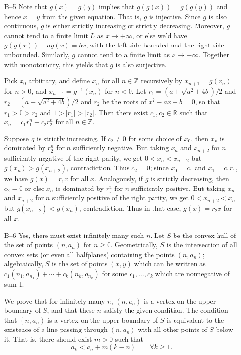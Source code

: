 \documentclass[amssymb,twocolumn,pra,10pt,aps]{revtex4-1}
\newcommand{\RR}{\mathbb{R}}
\newcommand{\ZZ}{\mathbb{Z}}
\begin{document}
\begin{itemize}
\item[B--5]
Note that $g(x) = g(y)$ implies that $g(g(x)) = g(g(y))$ and hence
$x = y$ from the given equation. That is, $g$ is injective. Since $g$
is also continuous, $g$ is either strictly increasing or strictly
decreasing. Moreover, $g$ cannot tend to a finite limit $L$ as $x \to
+\infty$, or else we'd have $g(g(x)) - ag(x) = bx$, with the left side
bounded and the right side unbounded. Similarly, $g$ cannot tend to
a finite limit as $x \to -\infty$. Together with monotonicity, this
yields that $g$ is also surjective.

Pick $x_0$ arbitrary, and define $x_n$ for all $n \in \ZZ$ recursively
by $x_{n+1} = g(x_n)$ for $n > 0$, and $x_{n-1} = g^{-1}(x_n)$ for $n<0$.
Let $r_1 = (a + \sqrt{a^2+4b})/2$ and $r_2 = (a - \sqrt{a^2+4b})/2$ and
$r_2$ be the roots of $x^2 - ax-b = 0$, so that $r_1 > 0 >
r_2$ and $1 > |r_1| > |r_2|$. Then there exist $c_1, c_2 \in \RR$ such that
$x_n = c_1 r_1^n + c_2 r_2^n$ for all $n \in \ZZ$.

Suppose $g$ is strictly increasing. If $c_2 \neq 0$ for some choice of
$x_0$, then $x_n$ is dominated by $r_2^n$ for $n$ sufficiently
negative. But taking $x_n$ and $x_{n+2}$ for $n$ sufficiently negative of the
right parity, we get $0 < x_n < x_{n+2}$ but $g(x_n) > g(x_{n+2})$,
contradiction. Thus $c_2 = 0$; since $x_0 = c_1$
and $x_1 = c_1 r_1$, we have $g(x) = r_1 x$ for all $x$.
Analogously, if $g$ is strictly decreasing, then $c_2 = 0$ or else
$x_n$ is dominated by $r_1^n$ for $n$ sufficiently positive. But taking
$x_n$ and $x_{n+2}$ for $n$ sufficiently positive of the right parity,
we get $0 < x_{n+2} <x_n$ but $g(x_{n+2}) < g(x_n)$, contradiction.
Thus in that case, $g(x) = r_2 x$ for all $x$.

\item[B--6]
Yes, there must exist infinitely many such $n$.
Let $S$ be the convex hull of the set of points $(n,
a_n)$ for $n \geq 0$. Geometrically, $S$ is the intersection of
all convex sets (or even all halfplanes) containing the points
$(n, a_n)$; algebraically, $S$ is the set of points $(x,y)$
which can be written as $c_1(n_1, a_{n_1}) + \cdots + c_k(n_k, a_{n_k})$
for some $c_1, \dots, c_k$ which are nonnegative of sum 1.

We prove that for infinitely many $n$, $(n, a_n)$ is a vertex on the upper
boundary of $S$, and that these $n$ satisfy the given
condition. The condition that $(n, a_n)$ is a vertex on the upper
boundary of $S$ is equivalent to the existence of a line passing through
$(n, a_n)$ with all other points of $S$ below it.
That is, there should exist $m>0$ such that
\begin{equation} \label{eq1}
a_k < a_n + m(k-n) \qquad \forall k \geq 1.
\end{equation}


\end{itemize}
\end{document}
